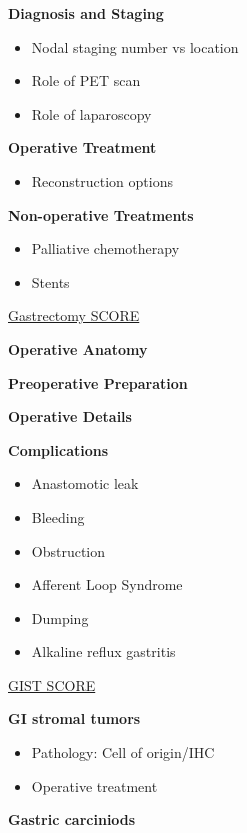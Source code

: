\documentclass[
  letterpaper,
]{scrbook}
\providecommand{\tightlist}{%
  \setlength{\itemsep}{0pt}\setlength{\parskip}{0pt}}
\begin{document}
\textbf{Diagnosis and Staging}

\begin{itemize}
\tightlist
\item
  Nodal staging number vs location
\item
  Role of PET scan
\item
  Role of laparoscopy
\end{itemize}

\textbf{Operative Treatment}

\begin{itemize}
\tightlist
\item
  Reconstruction options
\end{itemize}

\textbf{Non-operative Treatments}

\begin{itemize}
\tightlist
\item
  Palliative chemotherapy
\item
  Stents
\end{itemize}

\href{http://portal.surgicalcore.org/modulecontent.aspx?id=146287}{Gastrectomy
SCORE}

\textbf{Operative Anatomy}

\textbf{Preoperative Preparation}

\textbf{Operative Details}

\textbf{Complications}

\begin{itemize}
\tightlist
\item
  Anastomotic leak
\item
  Bleeding
\item
  Obstruction
\item
  Afferent Loop Syndrome
\item
  Dumping
\item
  Alkaline reflux gastritis
\end{itemize}

\href{http://portal.surgicalcore.org/modulecontent.aspx?id=136240}{GIST
SCORE}

\textbf{GI stromal tumors}

\begin{itemize}
\tightlist
\item
  Pathology: Cell of origin/IHC
\item
  Operative treatment
\end{itemize}

\textbf{Gastric carciniods}
\end{document}
